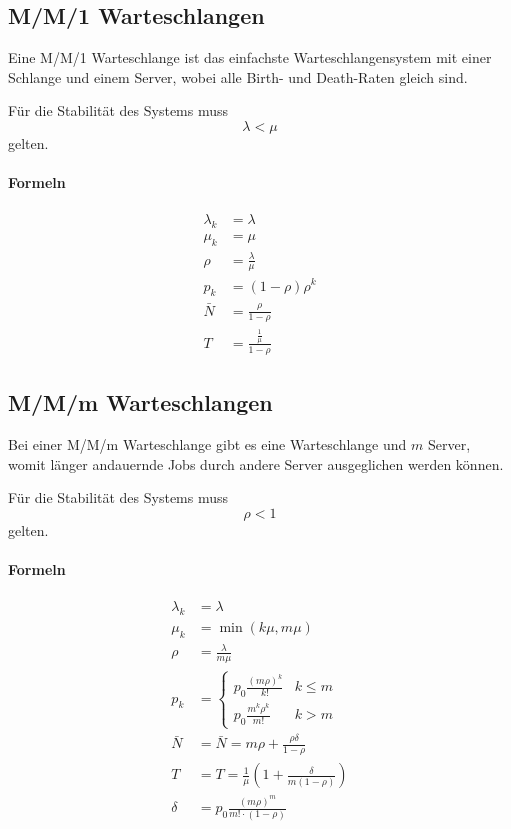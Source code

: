 		\subsection{M/M/1 Warteschlangen} %
			Eine M/M/1 Warteschlange ist das einfachste Warteschlangensystem mit einer Schlange und einem Server, wobei alle Birth- und Death-Raten gleich sind.
			
			Für die Stabilität des Systems muss \[ \lambda < \mu \] gelten.
			
			\paragraph{Formeln}
				\begin{align*}
					\lambda _ k & = \lambda                        \\
					\mu _ k     & = \mu                            \\
					\rho        & = \frac{\lambda}{\mu}            \\
					p _ k       & = (1 - \rho) \rho ^ k            \\
					\bar{N}     & = \frac{\rho}{1 - \rho}          \\
					T           & = \frac{\frac{1}{\mu}}{1 - \rho}
				\end{align*}
		
		\subsection{M/M/m Warteschlangen} %
			Bei einer M/M/m Warteschlange gibt es eine Warteschlange und \(m\) Server, womit länger andauernde Jobs durch andere Server ausgeglichen werden können.
			
			Für die Stabilität des Systems muss \[ \rho < 1 \] gelten.
			
			\paragraph{Formeln}
				\begin{align*}
					\lambda _ k & = \lambda              \\
					\mu _ k     & = \min(k\mu, m\mu)     \\
					\rho        & = \frac{\lambda}{m\mu} \\
					p _ k       & = \begin{cases}
						p _ 0 \frac{(m\rho) ^ k}{k!}    & k \leq m \\
						p _ 0 \frac{m ^ k \rho ^ k}{m!} & k > m
					\end{cases} \\
					\bar{N}     & = \bar{N} = m\rho + \frac{\rho\delta}{1 - \rho}      \\
					T           & = T = \frac{1}{\mu} (1 + \frac{\delta}{m(1 - \rho)}) \\
					\delta      & = p _ 0 \frac{(m\rho) ^ m}{m! \cdot (1 - \rho)}
				\end{align*}
		
